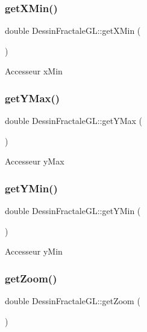 \subsubsection{\texorpdfstring{get\+X\+Min()}{getXMin()}}
{\footnotesize\ttfamily double Dessin\+Fractale\+G\+L\+::get\+X\+Min (\begin{DoxyParamCaption}{ }\end{DoxyParamCaption})}

Accesseur x\+Min \mbox{\label{classDessinFractaleGL_ade4c6d35f4b7b50b0f3fba0234170e17}} 
\subsubsection{\texorpdfstring{get\+Y\+Max()}{getYMax()}}
{\footnotesize\ttfamily double Dessin\+Fractale\+G\+L\+::get\+Y\+Max (\begin{DoxyParamCaption}{ }\end{DoxyParamCaption})}

Accesseur y\+Max \mbox{\label{classDessinFractaleGL_a78ee41ef94d377affbbacf4c63b47c85}} 
\subsubsection{\texorpdfstring{get\+Y\+Min()}{getYMin()}}
{\footnotesize\ttfamily double Dessin\+Fractale\+G\+L\+::get\+Y\+Min (\begin{DoxyParamCaption}{ }\end{DoxyParamCaption})}

Accesseur y\+Min \mbox{\label{classDessinFractaleGL_a65f03f1d92902cf57e088a99f573a93d}} 
\subsubsection{\texorpdfstring{get\+Zoom()}{getZoom()}}
{\footnotesize\ttfamily double Dessin\+Fractale\+G\+L\+::get\+Zoom (\begin{DoxyParamCaption}{ }\end{DoxyParamCaption})}

